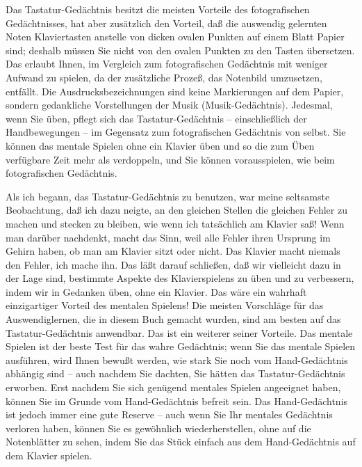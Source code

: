 Das Tastatur-Gedächtnis besitzt die meisten Vorteile des fotografischen Gedächtnisses, hat aber zusätzlich den Vorteil, daß die auswendig gelernten Noten Klaviertasten anstelle von dicken ovalen Punkten auf einem Blatt Papier sind; deshalb müssen Sie nicht von den ovalen Punkten zu den Tasten übersetzen.
Das erlaubt Ihnen, im Vergleich zum fotografischen Gedächtnis mit weniger Aufwand zu spielen, da der zusätzliche Prozeß, das Notenbild umzusetzen, entfällt.
Die Ausdrucksbezeichnungen sind keine Markierungen auf dem Papier, sondern gedankliche Vorstellungen der Musik (Musik-Gedächtnis).
Jedesmal, wenn Sie üben, pflegt sich das Tastatur-Gedächtnis -- einschließlich der Handbewegungen -- im Gegensatz zum fotografischen Gedächtnis von selbst.
Sie können das mentale Spielen ohne ein Klavier üben und so die zum Üben verfügbare Zeit mehr als verdoppeln, und Sie können vorausspielen, wie beim fotografischen Gedächtnis.

Als ich begann, das Tastatur-Gedächtnis zu benutzen, war meine seltsamste Beobachtung, daß ich dazu neigte, an den gleichen Stellen die gleichen Fehler zu machen und stecken zu bleiben, wie wenn ich tatsächlich am Klavier saß!
Wenn man darüber nachdenkt, macht das Sinn, weil alle Fehler ihren Ursprung im Gehirn haben, ob man am Klavier sitzt oder nicht.
Das Klavier macht niemals den Fehler, ich mache ihn.
Das läßt darauf schließen, daß wir vielleicht dazu in der Lage sind, bestimmte Aspekte des Klavierspielens zu üben und zu verbessern, indem wir in Gedanken üben, ohne ein Klavier.
Das wäre ein wahrhaft einzigartiger Vorteil des mentalen Spielens!
Die meisten Vorschläge für das Auswendiglernen, die in diesem Buch gemacht wurden, sind am besten auf das Tastatur-Gedächtnis anwendbar.
Das ist ein weiterer seiner Vorteile.
Das mentale Spielen ist der beste Test für das wahre Gedächtnis; wenn Sie das mentale Spielen ausführen, wird Ihnen bewußt werden, wie stark Sie noch vom Hand-Gedächtnis abhängig sind -- auch nachdem Sie dachten, Sie hätten das Tastatur-Gedächtnis erworben.
Erst nachdem Sie sich genügend mentales Spielen angeeignet haben, können Sie im Grunde vom Hand-Gedächtnis befreit sein.
Das Hand-Gedächtnis ist jedoch immer eine gute Reserve -- auch wenn Sie Ihr mentales Gedächtnis verloren haben, können Sie es gewöhnlich wiederherstellen, ohne auf die Notenblätter zu sehen, indem Sie das Stück einfach aus dem Hand-Gedächtnis auf dem Klavier spielen.

